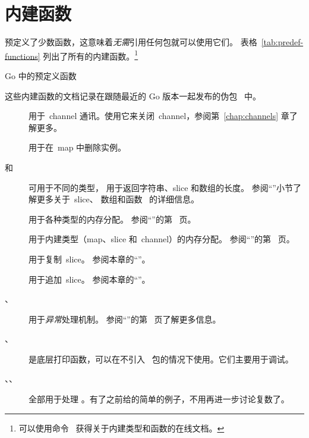 \section{内建函数}
预定义了少数函数，这意味着\emph{无需}引用任何包就可以使用它们。
表格~\ref{tab:predef-functions} 列出了所有的内建函数。\footnote{可以使用命令~
 获得关于内建类型和函数的在线文档。}

\begin{table}[H]
\begin{center}
\caption{Go 中的预定义函数}
\label{tab:predef-functions}

\end{center}
\end{table}

这些内建函数的文档记录在跟随最近的 Go 版本一起发布的伪包~  中。

\begin{description}
\item[] 用于~channel
通讯。使用它来关闭~channel，参阅第~\ref{chap:channels} 章了解更多。

\item[] 用于在~map 中删除实例。

\item[ 和~] 可用于不同的类型，
 用于返回字符串、slice 和数组的长度。
参阅``''小节了解更多关于~slice、
数组和函数~ 的详细信息。

\item[] 用于各种类型的内存分配。
参阅``''的第~\pageref{sec:allocation with new} 页。

\item[] 用于内建类型（map、slice 和~channel）的内存分配。
参阅``''的第~\pageref{sec:allocation with make} 页。

\item[] 用于复制~slice。
参阅本章的``''。

\item[] 用于追加~slice。
参阅本章的``''。

\item[、] 用于\emph{异常}处理机制。
参阅``''的第~\pageref{sec:panic} 页了解更多信息。

\item[、] 是底层打印函数，可以在不引入~
 包的情况下使用。它们主要用于调试。

\item[、、] 全部用于处理
。有了之前给的简单的例子，不用再进一步讨论复数了。
\end{description}


